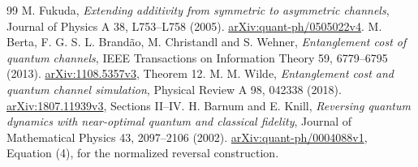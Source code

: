 \documentclass[11pt]{article}
\begin{document}
\begin{thebibliography}{99}
 M. Fukuda, \emph{Extending additivity from symmetric to asymmetric channels}, Journal of Physics A 38, L753--L758 (2005). \href{https://arxiv.org/abs/quant-ph/0505022}{arXiv:quant-ph/0505022v4}.
 M. Berta, F. G. S. L. Brand\~ao, M. Christandl and S. Wehner, \emph{Entanglement cost of quantum channels}, IEEE Transactions on Information Theory 59, 6779--6795 (2013). \href{https://arxiv.org/abs/1108.5357v3}{arXiv:1108.5357v3}, Theorem 12.
 M. M. Wilde, \emph{Entanglement cost and quantum channel simulation}, Physical Review A 98, 042338 (2018). \href{https://arxiv.org/abs/1807.11939v3}{arXiv:1807.11939v3}, Sections II--IV.
 H. Barnum and E. Knill, \emph{Reversing quantum dynamics with near-optimal quantum and classical fidelity}, Journal of Mathematical Physics 43, 2097--2106 (2002). \href{https://arxiv.org/abs/quant-ph/0004088v1}{arXiv:quant-ph/0004088v1}, Equation (4), for the normalized reversal construction.
\end{thebibliography}
\end{document}
